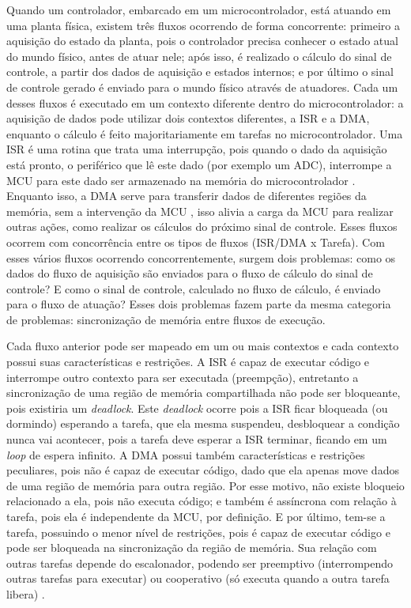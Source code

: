 Quando um controlador, embarcado em um microcontrolador, está atuando em uma planta física, existem três fluxos ocorrendo de forma concorrente: primeiro a aquisição do estado da planta, pois o controlador precisa conhecer o estado atual do mundo físico, antes de atuar nele; após isso, é realizado o cálculo do sinal de controle, a partir dos dados de aquisição e estados internos; e por último o sinal de controle gerado é enviado para o mundo físico através de atuadores. Cada um desses fluxos é executado em um contexto diferente dentro do microcontrolador: a aquisição de dados pode utilizar dois contextos diferentes, a \ac{ISR} e a \ac{DMA}, enquanto o cálculo é feito majoritariamente em tarefas no microcontrolador. Uma \ac{ISR} é uma rotina que trata uma interrupção, pois quando o dado da aquisição está pronto, o periférico que lê este dado (por exemplo um \ac{ADC}), interrompe a \ac{MCU} para este dado ser armazenado na memória do microcontrolador \citep{book:lee-seshia}. Enquanto isso, a \ac{DMA} serve para transferir dados de diferentes regiões da memória, sem a intervenção da \ac{MCU} \citep{book:stallings}, isso alivia a carga da \ac{MCU} para realizar outras ações, como realizar os cálculos do próximo sinal de controle. Esses fluxos ocorrem com concorrência entre os tipos de fluxos (\ac{ISR}/\ac{DMA} x Tarefa). Com esses vários fluxos ocorrendo concorrentemente, surgem dois problemas: como os dados do fluxo de aquisição são enviados para o fluxo de cálculo do sinal de controle? E como o sinal de controle, calculado no fluxo de cálculo, é enviado para o fluxo de atuação? Esses dois problemas fazem parte da mesma categoria de problemas: sincronização de memória entre fluxos de execução.

Cada fluxo anterior pode ser mapeado em um ou mais contextos e cada contexto possui suas características e restrições. A \ac{ISR} é capaz de executar código e interrompe outro contexto para ser executada (preempção), entretanto a sincronização de uma região de memória compartilhada não pode ser bloqueante, pois existiria um \textit{deadlock}. Este \textit{deadlock} ocorre pois a \ac{ISR} ficar bloqueada (ou dormindo) esperando a tarefa, que ela mesma suspendeu, desbloquear a condição nunca vai acontecer, pois a tarefa deve esperar a \ac{ISR} terminar, ficando em um \textit{loop} de espera infinito. A \ac{DMA} possui também características e restrições peculiares, pois não é capaz de executar código, dado que ela apenas move dados de uma região de memória para outra região. Por esse motivo, não existe bloqueio relacionado a ela, pois não executa código; e também é assíncrona com relação à tarefa, pois ela é independente da \ac{MCU}, por definição. E por último, tem-se a tarefa, possuindo o menor nível de restrições, pois é capaz de executar código e pode ser bloqueada na sincronização da região de memória. Sua relação com outras tarefas depende do escalonador, podendo ser preemptivo (interrompendo outras tarefas para executar) ou cooperativo (só executa quando a outra tarefa libera) \citep{book:lee-seshia}.

